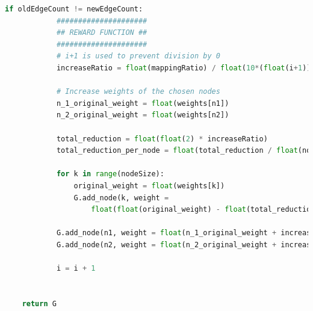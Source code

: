 \documentclass[journal]{IEEEtran}
\begin{document}
\begin{lstlisting}[language=Python]
        if oldEdgeCount != newEdgeCount:
            #####################
            ## REWARD FUNCTION ##
            #####################
            # i+1 is used to prevent division by 0
            increaseRatio = float(mappingRatio) / float(10*(float(i+1))) 

            # Increase weights of the chosen nodes
            n_1_original_weight = float(weights[n1])
            n_2_original_weight = float(weights[n2])

            total_reduction = float(float(2) * increaseRatio)
            total_reduction_per_node = float(total_reduction / float(nodeSize - 2))

            for k in range(nodeSize):
                original_weight = float(weights[k])
                G.add_node(k, weight = 
                    float(float(original_weight) - float(total_reduction_per_node)))

            G.add_node(n1, weight = float(n_1_original_weight + increaseRatio))
            G.add_node(n2, weight = float(n_2_original_weight + increaseRatio))

            i = i + 1


    return G
\end{lstlisting}
\end{document}
